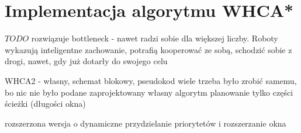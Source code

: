 \section{Implementacja algorytmu WHCA*}
\label{ch:alg-whca}

$TODO$ rozwiązuje bottleneck - nawet radzi sobie dla większej liczby.
Roboty wykazują inteligentne zachowanie, potrafią kooperować ze sobą, schodzić sobie z drogi, nawet, gdy już dotarły do swojego celu

WHCA2 - własny, schemat blokowy, pseudokod
wiele trzeba było zrobić samemu, bo nic nie było podane
zaprojektowany własny algorytm
planowanie tylko części ścieżki (długości okna)

rozszerzona wersja o dynamiczne przydzielanie priorytetów i rozszerzanie okna